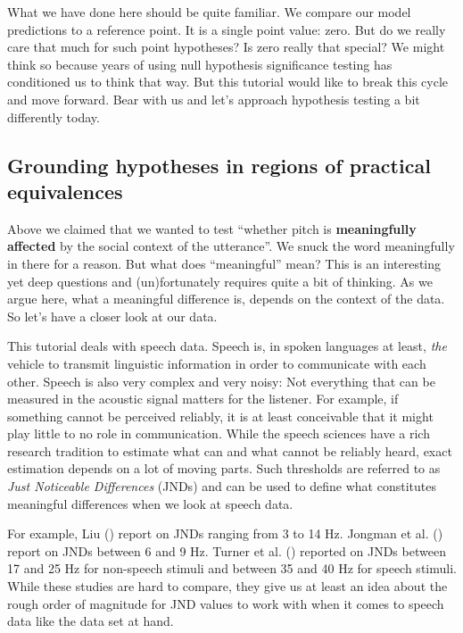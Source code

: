 \documentclass[
  doc,
  floatsintext,
  longtable,
  nolmodern,
  notxfonts,
  notimes,
  colorlinks=true,linkcolor=blue,citecolor=blue,urlcolor=blue]{apa7}
\begin{document}
What we have done here should be quite familiar. We compare our model
predictions to a reference point. It is a single point value: zero. But
do we really care that much for such point hypotheses? Is zero really
that special? We might think so because years of using null hypothesis
significance testing has conditioned us to think that way. But this
tutorial would like to break this cycle and move forward. Bear with us
and let's approach hypothesis testing a bit differently today.

\subsection{Grounding hypotheses in regions of practical
equivalences}\label{grounding-hypotheses-in-regions-of-practical-equivalences}

Above we claimed that we wanted to test ``whether pitch is
\textbf{meaningfully affected} by the social context of the utterance''.
We snuck the word meaningfully in there for a reason. But what does
``meaningful'' mean? This is an interesting yet deep questions and
(un)fortunately requires quite a bit of thinking. As we argue here, what
a meaningful difference is, depends on the context of the data. So let's
have a closer look at our data.

This tutorial deals with speech data. Speech is, in spoken languages at
least, \emph{the} vehicle to transmit linguistic information in order to
communicate with each other. Speech is also very complex and very noisy:
Not everything that can be measured in the acoustic signal matters for
the listener. For example, if something cannot be perceived reliably, it
is at least conceivable that it might play little to no role in
communication. While the speech sciences have a rich research tradition
to estimate what can and what cannot be reliably heard, exact estimation
depends on a lot of moving parts. Such thresholds are referred to as
\emph{Just Noticeable Differences} (JNDs) and can be used to define what
constitutes meaningful differences when we look at speech data.

For example, Liu () report on JNDs
ranging from 3 to 14 Hz. Jongman et al.
() report on JNDs between 6 and 9
Hz. Turner et al. () reported
on JNDs between 17 and 25 Hz for non-speech stimuli and between 35 and
40 Hz for speech stimuli. While these studies are hard to compare, they
give us at least an idea about the rough order of magnitude for JND
values to work with when it comes to speech data like the data set at
hand.
\end{document}
